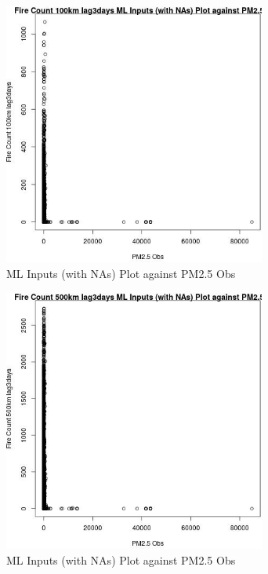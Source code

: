 \begin{figure} 
\centering  
\includegraphics[width=0.77\textwidth]{Code_Outputs/Report_ML_input_PM25_Step4_part_f_de_duplicated_aveswNAs_Fire_Count_100km_lag3daysvPM25_Obs.jpg} 
\caption{\label{fig:Report_ML_input_PM25_Step4_part_f_de_duplicated_aveswNAsFire_Count_100km_lag3daysvPM25_Obs}ML Inputs (with NAs) Plot against PM2.5 Obs} 
\end{figure} 
 

\begin{figure} 
\centering  
\includegraphics[width=0.77\textwidth]{Code_Outputs/Report_ML_input_PM25_Step4_part_f_de_duplicated_aveswNAs_Fire_Count_500km_lag3daysvPM25_Obs.jpg} 
\caption{\label{fig:Report_ML_input_PM25_Step4_part_f_de_duplicated_aveswNAsFire_Count_500km_lag3daysvPM25_Obs}ML Inputs (with NAs) Plot against PM2.5 Obs} 
\end{figure} 
 

